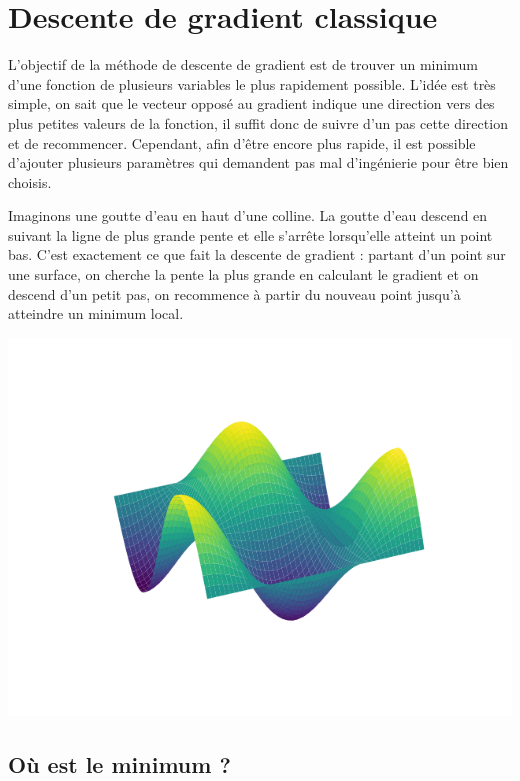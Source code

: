 \section{Descente de gradient classique}
L'objectif de la méthode de descente de gradient est de trouver un minimum d'une fonction de plusieurs variables le plus rapidement possible. L'idée est très simple, on sait que le vecteur opposé au gradient indique une direction vers des plus petites valeurs de la fonction, il suffit donc de suivre d'un pas cette direction et de recommencer. Cependant, afin d'être encore plus rapide, il est possible d'ajouter plusieurs paramètres qui demandent pas mal d'ingénierie pour être bien choisis.

Imaginons une goutte d'eau en haut d'une colline. La goutte d'eau descend en suivant la ligne de plus grande pente et elle s’arrête lorsqu'elle atteint un point bas. C'est exactement ce que fait la descente de gradient : partant d'un point sur une surface, on cherche la pente la plus grande en calculant le gradient et on descend d'un petit pas, on recommence à partir du nouveau point jusqu'à atteindre un minimum local.

\begin{center}
	\includegraphics[scale=\myscale,scale=0.6]{figures/descente_intro}
\end{center}


\subsection{Où est le minimum ?}

